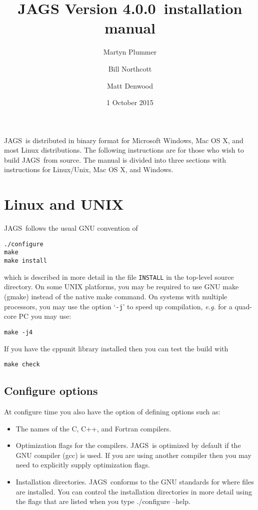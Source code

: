 \documentclass[11pt, a4paper, titlepage]{article}
\newcommand{\release}{4.0.0}
\newcommand{\JAGS}{\textsf{JAGS}}
\newcommand{\code}[1]{{\bgroup{\normalfont\ttfamily #1}\egroup}}
\newcommand{\samp}[1]{{`\bgroup\normalfont\texttt{#1}'\egroup}}
\let\command=\code
\let\option=\samp
\begin{document}
\title{JAGS Version \release\ installation manual}
\author{Martyn Plummer \and Bill Northcott \and Matt Denwood}
\date{1 October 2015}
\maketitle

\JAGS\ is distributed in binary format for Microsoft Windows, Mac OS
X, and most Linux distributions.  The following instructions are for
those who wish to build \JAGS\ from source. The manual is divided
into three sections with instructions for Linux/Unix, Mac OS X, and Windows.

\section{Linux and UNIX}

\JAGS\ follows the usual GNU convention of 
\begin{verbatim}
./configure
make
make install
\end{verbatim}
which is described in more detail in the file \texttt{INSTALL} in
the top-level source directory. On some UNIX platforms, you may
be required to use GNU make (gmake) instead of the native make
command. On systems with multiple processors, you may use the option 
\option{-j} to speed up compilation, {\em e.g.} for a quad-core PC you
may use:
\begin{verbatim}
make -j4
\end{verbatim}
If you have the cppunit library installed then you can test the build with
\begin{verbatim}
make check
\end{verbatim}

\subsection{Configure options}

At configure time you also have the option of defining options such
as:
\begin{itemize}
\item The names of the C, C++, and Fortran compilers.  
\item Optimization flags for the compilers.  \JAGS\ is optimized by
  default if the GNU compiler (gcc) is used. If you are using another
  compiler then you may need to explicitly supply optimization flags.
\item Installation directories. \JAGS\ conforms to the GNU standards
  for where files are installed. You can control the installation
  directories in more detail using the flags that are listed when
  you type \command{./configure --help}.
\end{itemize}
\end{document}
